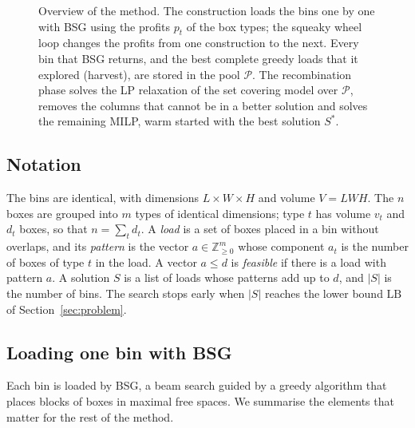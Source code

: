 \begin{figure}[t]
\caption{Overview of the method. The construction loads the bins one by one with BSG using the
profits $p_t$ of the box types; the squeaky wheel loop changes the profits from one construction
to the next. Every bin that BSG returns, and the best complete greedy loads that it explored
(harvest), are stored in the pool $\mathcal{P}$. The recombination phase solves the LP
relaxation of the set covering model over $\mathcal{P}$, removes the columns that cannot be in a
better solution and solves the remaining MILP, warm started with the best solution $S^*$.}
\label{fig:overview}
\end{figure}

\subsection{Notation}
\label{sec:m-notation}

The bins are identical, with dimensions $L\times W\times H$ and volume $V=LWH$. The $n$ boxes are
grouped into $m$ types of identical dimensions; type $t$ has volume $v_t$ and $d_t$ boxes, so
that $n=\sum_t d_t$. A \emph{load} is a set of boxes placed in a bin without overlaps, and its
\emph{pattern} is the vector $a\in\mathbb{Z}_{\ge 0}^{m}$ whose component $a_t$ is the number of
boxes of type $t$ in the load. A vector $a\le d$ is \emph{feasible} if there is a load with
pattern $a$. A solution $S$ is a list of loads whose patterns add up to $d$, and $|S|$ is the
number of bins. The search stops early when $|S|$ reaches the lower bound $\mathrm{LB}$ of
Section~\ref{sec:problem}.

\subsection{Loading one bin with BSG}
\label{sec:m-bsg}

Each bin is loaded by BSG, a beam search guided by a greedy algorithm \citep{Araya2014,Araya2017}
that places blocks of boxes in maximal free spaces. We summarise the elements that matter for
the rest of the method.

